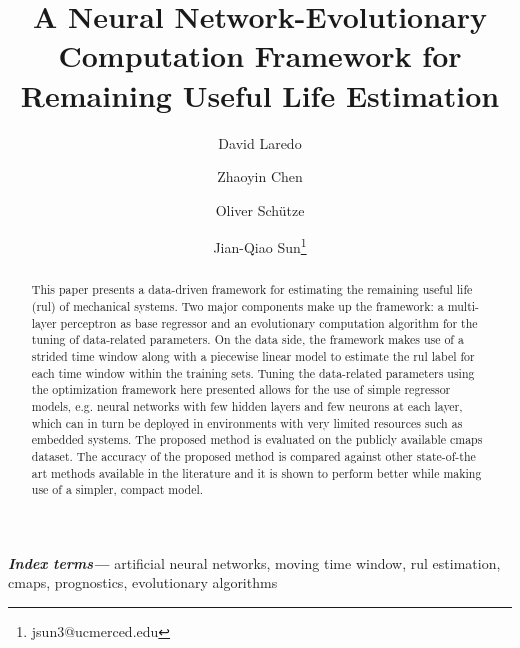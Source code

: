 \documentclass{article}
\title{A Neural Network-Evolutionary Computation Framework for Remaining Useful Life Estimation}
\author[1]{David Laredo}
\author[1]{Zhaoyin Chen}
\author[2]{Oliver Sch\"utze}
\author[1]{Jian-Qiao Sun\thanks{jsun3@ucmerced.edu}}
\affil[1]{School of Mechanical Engineering, University of California, Merced}
\affil[2]{Department of Computer Science, CINVESTAV, Mexico City, Mexico}
\date{}
\providecommand{\keywords}[1]{\textbf{\textit{Index terms---}} #1}
\begin{document}
\maketitle %

\thispagestyle{fancy} %


\glsunsetall


\begin{abstract}

\noindent 

This paper presents a data-driven framework for estimating the remaining useful life (\gls{rul}) of mechanical systems. Two major components make up the framework: a multi-layer perceptron as base regressor and an evolutionary computation algorithm for the tuning of data-related parameters. On the data side, the framework makes use of a strided time window along with a piecewise linear model to estimate the \gls{rul} label for each time window within the training sets. Tuning the data-related parameters using the optimization framework here presented allows for the use of simple regressor models, e.g. neural networks with few hidden layers and few neurons at each layer, which can in turn be deployed in environments with very limited resources such as embedded systems. The proposed method is evaluated on the publicly available \gls{cmaps} dataset. The accuracy of the proposed method is compared against other state-of-the art methods available in the literature and it is shown to perform better while making use of a simpler, compact model.
\end{abstract}

\keywords{artificial neural networks, moving time window, \gls{rul} estimation, \gls{cmaps}, prognostics, evolutionary algorithms}



\end{document}
